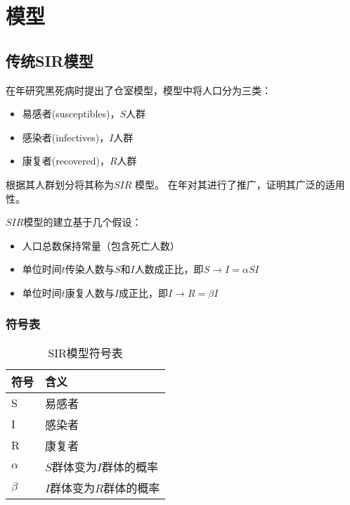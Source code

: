 \section{模型}
\subsection{传统SIR模型}
\citeauthor{对流行病数学理论的贡献}在\citeyear{对流行病数学理论的贡献}年研究黑死病时提出了仓室模型，模型中将人口分为三类：
\begin{itemize}
    \item 易感者(susceptibles)，$S$人群
    \item 感染者(infectives)，$I$人群
    \item 康复者(recovered)，$R$人群
\end{itemize}
\par 根据其人群划分将其称为$SIR$
\cite{对流行病数学理论的贡献}模型。
\citeauthor{Kermack-McKendrick确定性流行病模型的推广}在\citeyear{Kermack-McKendrick确定性流行病模型的推广}年对其进行了推广\cite{Kermack-McKendrick确定性流行病模型的推广}，证明其广泛的适用性。
\par $SIR$模型的建立基于几个假设\cite{对流行病数学理论的贡献}：
\begin{itemize}
    \item 人口总数保持常量（包含死亡人数）
    \item 单位时间$t$传染人数与$S$和$I$人数成正比，即$S\to I = \alpha SI$
    \item 单位时间$t$康复人数与$I$成正比，即$I\to R = \beta I$
\end{itemize}
\subsubsection{符号表}
\begin{table}[H]
    \centering
    \caption{SIR模型符号表}
    \label{table:SIR模型符号表}
    \begin{tabular}{ll}
        \hline
        符号     & 含义                     \\
        \hline
        S        & 易感者                   \\
        I        & 感染者                   \\
        R        & 康复者                   \\
        $\alpha$ & $S$群体变为$I$群体的概率 \\
        $\beta$  & $I$群体变为$R$群体的概率 \\
        \hline
    \end{tabular}
\end{table}
